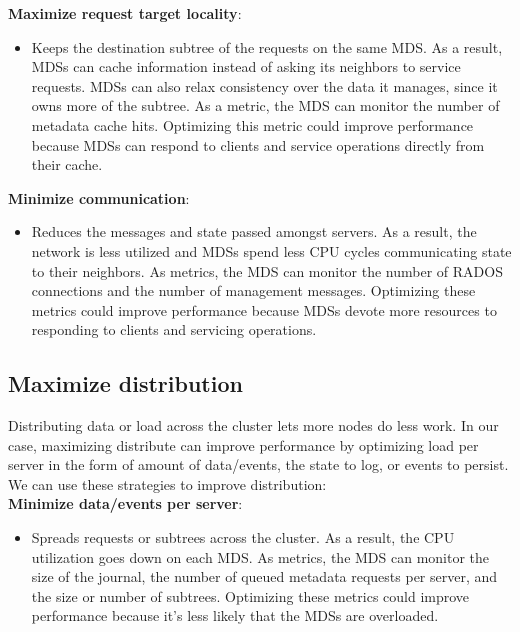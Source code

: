 \noindent\textbf{Maximize request target locality}:
\begin{itemize}
	\item[] Keeps the destination subtree of the requests on the same MDS. As a result, MDSs can cache information instead of asking its neighbors to service requests. MDSs can also relax consistency over the data it manages, since it owns more of the subtree. As a metric, the MDS can monitor the number of metadata cache hits. Optimizing this metric could improve performance because MDSs can respond to clients and service operations directly from their cache.
\end{itemize}

\noindent\textbf{Minimize communication}: 
\begin{itemize}
	\item[] Reduces the messages and state passed amongst servers. As a result, the network is less utilized and MDSs spend less CPU cycles communicating state to their neighbors. As metrics, the MDS can monitor the number of RADOS connections and the number of management messages. Optimizing these metrics could improve performance because MDSs devote more resources to responding to clients and servicing operations.
\end{itemize}

\subsection{Maximize distribution}
Distributing data or load across the cluster lets more nodes do less work. In our case, maximizing distribute can improve performance by optimizing load per server in the form of amount of data/events, the state to log, or events to persist. We can use these strategies to improve distribution:\\

\noindent\textbf{Minimize data/events per server}: 
\begin{itemize}
	\item[] Spreads requests or subtrees across the cluster. As a result, the CPU utilization goes down on each MDS. As metrics, the MDS can monitor the size of the journal, the number of queued metadata requests per server, and the size or number of subtrees. Optimizing these metrics could improve performance because it's less likely that the MDSs are overloaded.
\end{itemize}

